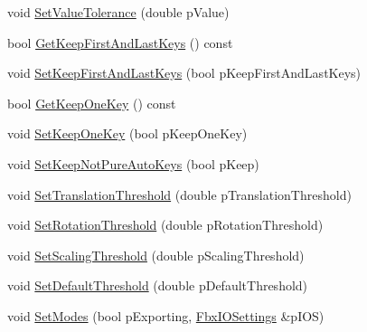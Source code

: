 \begin{DoxyCompactItemize}
\item 
void \hyperlink{class_fbx_anim_curve_filter_constant_key_reducer_a86a4427b2a29f5a82a0d1535048a44eb}{Set\+Value\+Tolerance} (double p\+Value)
\item 
bool \hyperlink{class_fbx_anim_curve_filter_constant_key_reducer_acb96f386ab154175fff45e7fdcbbfb3f}{Get\+Keep\+First\+And\+Last\+Keys} () const
\item 
void \hyperlink{class_fbx_anim_curve_filter_constant_key_reducer_a8833a42ff21debd38098de294ea9cbd2}{Set\+Keep\+First\+And\+Last\+Keys} (bool p\+Keep\+First\+And\+Last\+Keys)
\item 
bool \hyperlink{class_fbx_anim_curve_filter_constant_key_reducer_a098b50fec08965071f8eb5aec3a02e78}{Get\+Keep\+One\+Key} () const
\item 
void \hyperlink{class_fbx_anim_curve_filter_constant_key_reducer_ad71523fadea43a9532d600040b37a865}{Set\+Keep\+One\+Key} (bool p\+Keep\+One\+Key)
\item 
void \hyperlink{class_fbx_anim_curve_filter_constant_key_reducer_ae233ca614a39edb0e496f0dbc510f0ae}{Set\+Keep\+Not\+Pure\+Auto\+Keys} (bool p\+Keep)
\item 
void \hyperlink{class_fbx_anim_curve_filter_constant_key_reducer_acc31edd257d4b94cc91a899b7d45deb2}{Set\+Translation\+Threshold} (double p\+Translation\+Threshold)
\item 
void \hyperlink{class_fbx_anim_curve_filter_constant_key_reducer_a60e81af3f1d41764a42a9ddea89acb97}{Set\+Rotation\+Threshold} (double p\+Rotation\+Threshold)
\item 
void \hyperlink{class_fbx_anim_curve_filter_constant_key_reducer_af15fcce7deb4c02ea677fb3612fb368c}{Set\+Scaling\+Threshold} (double p\+Scaling\+Threshold)
\item 
void \hyperlink{class_fbx_anim_curve_filter_constant_key_reducer_ab2bd860bc4704e2f0945f58a66b040d6}{Set\+Default\+Threshold} (double p\+Default\+Threshold)
\item 
void \hyperlink{class_fbx_anim_curve_filter_constant_key_reducer_aa0d5c478c267b58cd0de9cedb9f931dd}{Set\+Modes} (bool p\+Exporting, \hyperlink{class_fbx_i_o_settings}{Fbx\+I\+O\+Settings} \&p\+I\+OS)
\end{DoxyCompactItemize}
